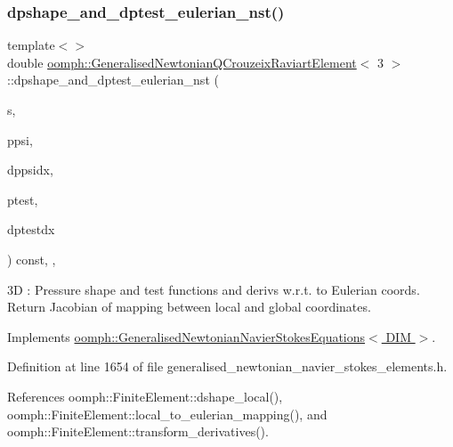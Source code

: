 \subsubsection{\texorpdfstring{dpshape\+\_\+and\+\_\+dptest\+\_\+eulerian\+\_\+nst()}{dpshape\_and\_dptest\_eulerian\_nst()}\hspace{0.1cm}{\footnotesize\ttfamily [3/3]}}
{\footnotesize\ttfamily template$<$$>$ \\
double \hyperlink{classoomph_1_1GeneralisedNewtonianQCrouzeixRaviartElement}{oomph\+::\+Generalised\+Newtonian\+Q\+Crouzeix\+Raviart\+Element}$<$ 3 $>$\+::dpshape\+\_\+and\+\_\+dptest\+\_\+eulerian\+\_\+nst (\begin{DoxyParamCaption}\item[{const \hyperlink{classoomph_1_1Vector}{Vector}$<$ double $>$ \&}]{s,  }\item[{\hyperlink{classoomph_1_1Shape}{Shape} \&}]{ppsi,  }\item[{\hyperlink{classoomph_1_1DShape}{D\+Shape} \&}]{dppsidx,  }\item[{\hyperlink{classoomph_1_1Shape}{Shape} \&}]{ptest,  }\item[{\hyperlink{classoomph_1_1DShape}{D\+Shape} \&}]{dptestdx }\end{DoxyParamCaption}) const\hspace{0.3cm}{\ttfamily [inline]}, {\ttfamily [protected]}, {\ttfamily [virtual]}}

3D \+: Pressure shape and test functions and derivs w.\+r.\+t. to Eulerian coords. Return Jacobian of mapping between local and global coordinates. 

Implements \hyperlink{classoomph_1_1GeneralisedNewtonianNavierStokesEquations_a00027d27dfdf3c0b72b0d1df9addfdc8}{oomph\+::\+Generalised\+Newtonian\+Navier\+Stokes\+Equations$<$ D\+I\+M $>$}.



Definition at line 1654 of file generalised\+\_\+newtonian\+\_\+navier\+\_\+stokes\+\_\+elements.\+h.



References oomph\+::\+Finite\+Element\+::dshape\+\_\+local(), oomph\+::\+Finite\+Element\+::local\+\_\+to\+\_\+eulerian\+\_\+mapping(), and oomph\+::\+Finite\+Element\+::transform\+\_\+derivatives().

\mbox{\label{classoomph_1_1GeneralisedNewtonianQCrouzeixRaviartElement_a8320a0d6ad5e4f9a19ab412fb69c00e7}} 
